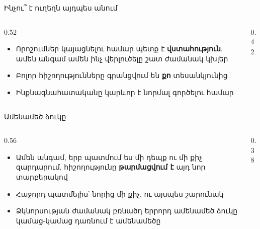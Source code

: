 \begin{frame}{Ինչու՞ է ուղեղն այդպես անում}
  \begin{columns}[c]
    \begin{column}{0.52\textwidth}
      \begin{itemize}
        \item Որոշումներ կայացնելու համար պետք է \textbf{վստահություն}. ամեն անգամ ամեն ինչ վերլուծելը շատ ժամանակ կխլեր
        \item Բոլոր հիշողությունները գրանցվում են \textbf{քո} տեսանկյունից
        \item Ինքնագնահատականը կարևոր է նորմալ գործելու համար
      \end{itemize}
    \end{column}
    \begin{column}{0.42\textwidth}
    \end{column}
  \end{columns}
\end{frame}

\begin{frame}{Ամենամեծ ձուկը}
  \begin{columns}[c]
    \begin{column}{0.56\textwidth}
      \begin{itemize}
        \item Ամեն անգամ, երբ պատմում ես մի դեպք ու մի քիչ զարդարում, հիշողությունը \textbf{թարմացվում է} այդ նոր տարբերակով
        \item<2-> Հաջորդ պատմելիս՝ նորից մի քիչ, ու այսպես շարունակ
        \item<3-> Ձկնորսության ժամանակ բռնածդ երրորդ ամենամեծ ձուկը կամաց-կամաց դառնում է ամենամեծը 
      \end{itemize}
    \end{column}
    \begin{column}{0.38\textwidth}
    \end{column}
  \end{columns}
\end{frame}

